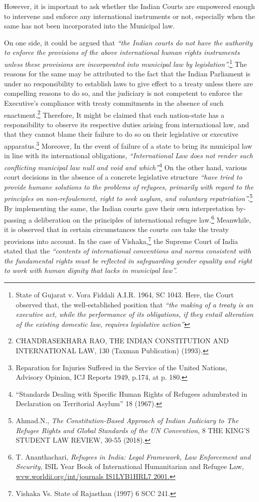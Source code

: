 \begin{multicols}{2}
\noi
However, it is important to ask whether the Indian Courts are empowered enough to intervene
and enforce any international instruments or not, especially when the same has not been
incorporated into the Municipal law.

\noi
On one side, it could be argued that \textit{“the Indian courts do not have the authority to enforce
the provisions of the above international human rights instruments unless these provisions are
incorporated into municipal law by legislation”.}\footnote{State of Gujarat v. Vora Fiddali A.I.R. 1964, SC 1043. Here, the Court observed that, the well-established position that \textit{“the making of a treaty is an executive act, while the performance of its obligations, if they entail alteration of the existing domestic law, requires legislative action”}} The reasons for the same may be attributed
to the fact that the Indian Parliament is under no responsibility to establish laws to give effect
to a treaty unless there are compelling reasons to do so, and the judiciary is not competent to
enforce the Executive's compliance with treaty commitments in the absence of such
enactment.\footnote{CHANDRASEKHARA RAO, THE INDIAN CONSTITUTION AND INTERNATIONAL LAW, 130
(Taxman Publication) (1993).}  Therefore, It might be claimed that each nation-state has a responsibility to
observe its respective duties arising from international law, and that they cannot blame their
failure to do so on their legislative or executive apparatus.\footnote{Reparation for Injuries Suffered in the Service of the United Nations, Advisory Opinion, ICJ Reports 1949, p.174, at p. 180.}  Moreover, In the event of failure
of a state to bring its municipal law in line with its international obligations, \textit{“International Law does not render such conflicting municipal law null and void and which”}\footnote{“Standards Dealing with Specific Human Rights of Refugees adumbrated in Declaration on Territorial Asylum” 18 (1967).}  On the other hand, various court decisions in the absence of a concrete legislative structure \textit{“have tried to provide humane solutions to the problems of refugees, primarily with regard to the principles on non-refoulement, right to seek asylum, and voluntary repatriation”.}\footnote{Ahmad.N., \textit{The Constitution-Based Approach of Indian Judiciary to The Refugee Rights and Global Standards of the UN Convention,} 8 THE KING’S STUDENT LAW REVIEW, 30-55 (2018).} By implementing the same, the Indian courts gave their own interpretation by-passing a deliberation on the
principles of international refugee law.\footnote{T. Ananthachari, \textit{Refugees in India: Legal Framework, Law Enforcement and Security,} ISIL Year Book of International Humanitarian and Refugee Law, \url{wvw.worldii.org/int/journals IS1LYB1HRL7 2001.}} Meanwhile, it is observed that in certain
circumstances the courts \textit{can} take the treaty provisions into account. In the case of Vishaka,\footnote{Vishaka Vs. State of Rajasthan (1997) 6 SCC 241.} the Supreme Court of India stated that the \textit{“contents of international conventions and norms
consistent with the fundamental rights must be reflected in safeguarding gender equality and
right to work with human dignity that lacks in municipal law”.}


\end{multicols}
